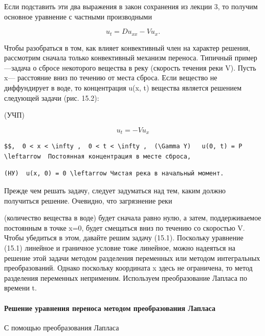 \documentclass[
  ukrainian,
]{article}
\begin{document}
Если подставить эти два выражения в закон сохранения из лекции 3, то
получим основное уравнение с частными производными

\[
u_t = Du_{xx} - Vu_x.
\]

Чтобы разобраться в том, как влияет конвективный член на характер
решения, рассмотрим сначала только конвективный механизм переноса.
Типичный пример---задача о сбросе некоторого вещества в реку (скорость
течения реки V). Пусть x--- расстояние вниз по течению от места сброса.
Если вещество не диффундирует в воде, то концентрация u(x, t) вещества
является решением следующей задачи (рис. 15.2):

(УЧП)

\[
u_t = -Vu_x
\]

\begin{verbatim}
$$,  0 < x < \infty ,  0 < t < \infty ,  (\Gamma Y)   u(0, t) = P \leftarrow  Постоянная концентрация в месте сброса,
\end{verbatim}

\begin{verbatim}
(НУ)  u(x, 0) = 0 \leftarrow Чистая река в начальный момент.
\end{verbatim}

Прежде чем решать задачу, следует задуматься над тем, каким должно
получиться решение. Очевидно, что загрязнение реки

(количество вещества в воде) будет сначала равно нулю, а затем,
поддерживаемое постоянным в точке x=0, будет смещаться вниз по течению
со скоростью V. Чтобы убедиться в этом, давайте решим задачу (15.1).
Поскольку уравнение (15.1) линейное и граничное условие тоже линейное,
можно надеяться на решение этой задачи методом разделения переменных или
методом интегральных преобразований. Однако поскольку координата x здесь
не ограничена, то метод разделения переменных неприменим. Используем
преобразование Лапласа по времени t.

\paragraph{Решение уравнения переноса методом преобразования
Лапласа}\label{ux440ux435ux448ux435ux43dux438ux435-ux443ux440ux430ux432ux43dux435ux43dux438ux44f-ux43fux435ux440ux435ux43dux43eux441ux430-ux43cux435ux442ux43eux434ux43eux43c-ux43fux440ux435ux43eux431ux440ux430ux437ux43eux432ux430ux43dux438ux44f-ux43bux430ux43fux43bux430ux441ux430}

С помощью преобразования Лапласа
\end{document}
